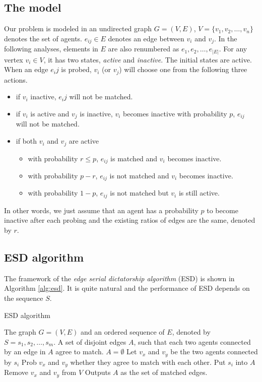 \documentclass[letterpaper]{article}
\begin{document}
\subsection{The model}

Our problem is modeled in an undirected graph $G=(V,E)$, $V=\{v_1,v_2,\ldots,v_n\}$ denotes the set of agents. $e_{ij}\in E$ denotes an edge between $v_i$ and $v_j$. In the following analyses, elements in $E$ are also renumbered as $e_1,e_2,\ldots,e_{|E|}$. 
For any vertex $v_i\in V$, it has two states, \textit{active} and \textit{inactive}.
The initial states are active.
When an edge $e_ij$ is probed, $v_i$ (or $v_j$) will choose one from the following three actions.
\begin{itemize}
	\item if $v_i$ inactive, $e_ij$ will not be matched.
	\item if $v_i$ is active and $v_j$ is inactive, $v_i$ becomes inactive with probability $p$, $e_{ij}$ will not be matched.
	\item if both $v_i$ and $v_j$ are active
	\begin{itemize}
		\item with probability $r\leq p$, $e_{ij}$ is matched and $v_i$ becomes inactive.
		\item with probability $p-r$, $e_{ij}$ is not matched and $v_i$ becomes inactive.
		\item with probability $1-p$, $e_{ij}$ is not matched but $v_i$ is still active.
	\end{itemize}
\end{itemize} 

In other words, we just assume that an agent has a probability $p$ to become inactive after each probing and the existing ratios of edges are the same, denoted by $r$.


\subsection{ESD algorithm}

The framework of the \textit{edge serial dictatorship algorithm} (ESD) is shown in Algorithm \ref{alg:esd}.
It is quite natural and the performance of ESD depends on the sequence $S$.

\begin{algorithm}
	\caption{ESD algorithm}
	\label{alg:esd}
	\begin{algorithmic}[1]
		\Require
		The graph $G=(V,E)$ and an ordered sequence of $E$, denoted by $S=s_1,s_2,\ldots,s_m$.
		\Ensure A set of disjoint edges $A$, such that each two agents connected by an edge in $A$ agree to match. 
		\State $A=\emptyset$
		\State Let $v_x$ and $v_y$ be the two agents connected by $s_i$
		\State Prob $v_x$ and $v_y$ whether they agree to match with each other.
		\State Put $s_i$ into $A$
		\State Remove $v_x$ and $v_y$ from $V$
		\EndIf
		\EndIf
		\EndFor
		\State Outputs $A$ as the set of matched edges.
	\end{algorithmic}
\end{algorithm}
\end{document}
